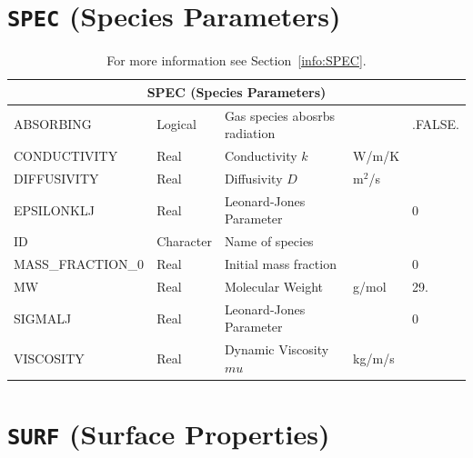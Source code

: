 \documentclass[11pt]{book}
\begin{document}
\vfill

\section{\texorpdfstring{{\tt SPEC}}{SPEC} (Species Parameters)}

\hspace{1in}

\begin{table}[H]
\caption{For more information see Section~\ref{info:SPEC}.}\label{tbl:SPEC}
\noindent
\begin{tabular*}{\textwidth}{@{\extracolsep{\fill}}|l|l|l|l|l|}
\hline
\multicolumn{5}{|c|}{{\ct SPEC} (Species Parameters)} \\ \hline \hline
{\ct ABSORBING}         & Logical     & Gas species abosrbs radiation   &                   & {\ct .FALSE.} \\ \hline
{\ct CONDUCTIVITY}      & Real        & Conductivity $k$                & W/m/K             &     \\ \hline
{\ct DIFFUSIVITY}       & Real        & Diffusivity   $D$               & m$^2$/s           &     \\ \hline
{\ct EPSILONKLJ}        & Real        & Leonard-Jones Parameter         &                   & 0   \\ \hline
{\ct ID }               & Character   & Name of species                 &                   &     \\ \hline
{\ct MASS\_FRACTION\_0} & Real        & Initial mass fraction           &                   & 0   \\ \hline
{\ct MW}                & Real        & Molecular Weight                & g/mol             & 29.  \\ \hline
{\ct SIGMALJ}           & Real        & Leonard-Jones Parameter         &                   & 0   \\ \hline
{\ct VISCOSITY}         & Real        & Dynamic Viscosity $mu$          & kg/m/s            &     \\ \hline
\end{tabular*}
\end{table}

\vspace{\baselineskip}

\vfill


\section{\texorpdfstring{{\tt SURF}}{SURF} (Surface Properties)}
\end{document}
